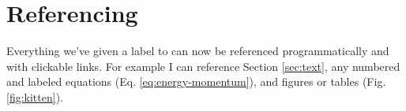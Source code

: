 \documentclass[12pt]{report}
\begin{document}
\section{Referencing}
    Everything we've given a label to can now be referenced programmatically and with clickable links. For example I can reference Section \ref{sec:text}, any numbered and labeled equations (Eq. \ref{eq:energy-momentum}), and figures or tables (Fig. \ref{fig:kitten}).
    
    
\end{document}
